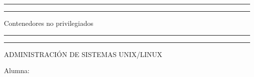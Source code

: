 \documentclass[a4paper, 11pt, oneside]{article}
\begin{document}
 

\begin{titlepage} 

	\centering 
	
	\scshape 
	
	\vspace*{\baselineskip} 
	
	
	
	\rule{\textwidth}{1.6pt}\vspace*{-\baselineskip}\vspace*{2pt} 
	\rule{\textwidth}{0.4pt} 
	
	\vspace{0.75\baselineskip} 
	
	{\LARGE Contenedores no privilegiados}	
	\vspace{0.75\baselineskip} 
	
	\rule{\textwidth}{0.4pt}\vspace*{-\baselineskip}\vspace{3.2pt}
	\rule{\textwidth}{1.6pt} 
	
	\vspace{2\baselineskip} 
	

	ADMINISTRACIÓN DE SISTEMAS UNIX/LINUX
	
	\vspace*{1\baselineskip} 
	
	
	
	Alumna:
	
	\vspace{0.2\baselineskip} 
	

\end{titlepage}
\end{document}
